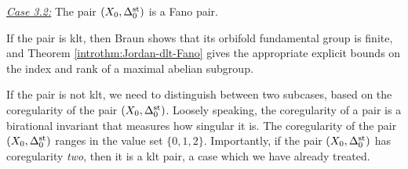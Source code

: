 \documentclass{amsart}
\theoremstyle{definition}
\theoremstyle{remark}
\numberwithin{equation}{section}
\begin{document}
\medskip

\hfill \begin{minipage}{0.95\textwidth}
\noindent\underline{\textit{Case 3.2:}} The pair $(X_0,\Delta_0^{\rm st})$ is a Fano pair.

\medskip

If the pair is klt, then Braun \cite{Bra20} shows that its orbifold fundamental group is finite, and Theorem \ref{introthm:Jordan-dlt-Fano} gives the appropriate explicit bounds on the index and rank of a maximal abelian subgroup.

\medskip

If the pair is not klt, we need to distinguish between two subcases, based on the coregularity of the pair $(X_0,\Delta_0^{\rm st})$. Loosely speaking, the coregularity of a pair is a birational invariant that measures how singular it is. The coregularity of the pair $(X_0,\Delta_0^{\rm st})$ ranges in the value set $\{0,1,2\}$. Importantly, if the pair $(X_0,\Delta_0^{\rm st})$ has coregularity {\it two}, then it is a klt pair, a case which we have already treated.
\end{minipage}

\medskip
\end{document}
